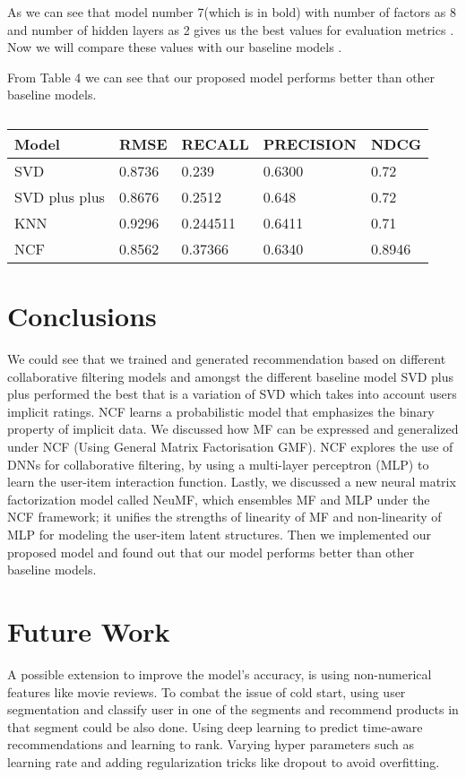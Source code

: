 \documentclass[sigconf]{acmart}
\begin{document}
As we can see that model number 7(which is in bold) with number of factors as 8 and number of hidden layers as 2 gives us the best values for evaluation metrics .
Now we will compare these values with our baseline models .

From Table 4 we can see that our proposed model performs better than other baseline models.

\begin{table}[]
\begin{tabular}{|l|l|l|l|l|}
\hline
\textbf{Model} & \textbf{RMSE} & \textbf{RECALL} & \textbf{PRECISION} & \textbf{NDCG} \\ \hline
SVD            & 0.8736        & 0.239           & 0.6300             & 0.72          \\ \hline
SVD plus plus  & 0.8676        & 0.2512          & 0.648              & 0.72          \\ \hline
KNN            & 0.9296        & 0.244511        & 0.6411             & 0.71          \\ \hline
NCF            & 0.8562        & 0.37366         & 0.6340             & 0.8946        \\ \hline
\end{tabular}
\caption{}
\end{table}

\section{Conclusions}\label{sec:conclusions}
We could see that we trained and generated recommendation based on different collaborative filtering models and amongst the different baseline model SVD plus plus performed the best that is a variation of SVD which takes into account users implicit ratings.
NCF learns a probabilistic model that emphasizes the binary property of implicit data. We discussed how MF can be expressed and generalized under NCF (Using General Matrix Factorisation {GMF}). NCF explores the use of DNNs for collaborative filtering, by using a multi-layer perceptron (MLP) to learn the user-item interaction function. Lastly, we discussed a new neural matrix factorization model called NeuMF, which ensembles MF and MLP under the NCF framework; it unifies the strengths of linearity of MF and non-linearity of MLP for modeling the user-item latent structures. 
Then we implemented our proposed model and found out that our model performs better than other baseline models.


\section{Future Work}\label{sec:conclusions}
A possible extension to improve the model's accuracy, is using non-numerical features like movie reviews. To combat the issue of cold start, using user segmentation and classify user in one of the segments and recommend products in that segment could be also done. Using deep learning to predict time-aware recommendations and learning to rank. Varying hyper parameters such as learning rate and adding regularization tricks like dropout to avoid overfitting.
\end{document}
